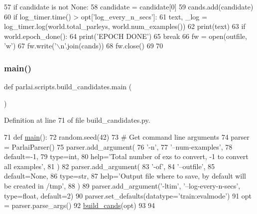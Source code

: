 \begin{DoxyCode}
57             \textcolor{keywordflow}{if} candidate \textcolor{keywordflow}{is} \textcolor{keywordflow}{not} \textcolor{keywordtype}{None}:
58                 candidate = candidate[0]
59                 cands.add(candidate)
60         \textcolor{keywordflow}{if} log\_timer.time() > opt[\textcolor{stringliteral}{'log\_every\_n\_secs'}]:
61             text, \_log = log\_timer.log(world.total\_parleys, world.num\_examples())
62             print(text)
63         \textcolor{keywordflow}{if} world.epoch\_done():
64             print(\textcolor{stringliteral}{'EPOCH DONE'})
65             \textcolor{keywordflow}{break}
66     fw = open(outfile, \textcolor{stringliteral}{'w'})
67     fw.write(\textcolor{stringliteral}{'\(\backslash\)n'}.join(cands))
68     fw.close()
69 
70 
\end{DoxyCode}
\mbox{\label{namespaceparlai_1_1scripts_1_1build__candidates_a99ffd6743adcd4a6f0f5a26418d21a3a}} 
\subsubsection{\texorpdfstring{main()}{main()}}
{\footnotesize\ttfamily def parlai.\+scripts.\+build\+\_\+candidates.\+main (\begin{DoxyParamCaption}{ }\end{DoxyParamCaption})}



Definition at line 71 of file build\+\_\+candidates.\+py.


\begin{DoxyCode}
71 \textcolor{keyword}{def }\hyperlink{namespaceparlai_1_1scripts_1_1build__candidates_a99ffd6743adcd4a6f0f5a26418d21a3a}{main}():
72     random.seed(42)
73     \textcolor{comment}{# Get command line arguments}
74     parser = ParlaiParser()
75     parser.add\_argument(
76         \textcolor{stringliteral}{'-n'},
77         \textcolor{stringliteral}{'--num-examples'},
78         default=-1,
79         type=int,
80         help=\textcolor{stringliteral}{'Total number of exs to convert, -1 to convert all examples'},
81     )
82     parser.add\_argument(
83         \textcolor{stringliteral}{'-of'},
84         \textcolor{stringliteral}{'--outfile'},
85         default=\textcolor{keywordtype}{None},
86         type=str,
87         help=\textcolor{stringliteral}{'Output file where to save, by default will be created in /tmp'},
88     )
89     parser.add\_argument(\textcolor{stringliteral}{'-ltim'}, \textcolor{stringliteral}{'--log-every-n-secs'}, type=float, default=2)
90     parser.set\_defaults(datatype=\textcolor{stringliteral}{'train:evalmode'})
91     opt = parser.parse\_args()
92     \hyperlink{namespaceparlai_1_1scripts_1_1build__candidates_a7932b774b6e77c36347f89f3d79c676e}{build\_cands}(opt)
93 
94 
\end{DoxyCode}
